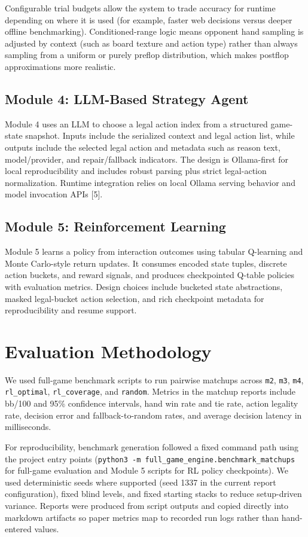 \documentclass[11pt]{article}
\begin{document}
Configurable trial budgets allow the system to trade accuracy for runtime depending on where it is used (for example, faster web decisions versus deeper offline benchmarking). Conditioned-range logic means opponent hand sampling is adjusted by context (such as board texture and action type) rather than always sampling from a uniform or purely preflop distribution, which makes postflop approximations more realistic.

\subsection{Module 4: LLM-Based Strategy Agent}
Module 4 uses an LLM to choose a legal action index from a structured game-state snapshot. Inputs include the serialized context and legal action list, while outputs include the selected legal action and metadata such as reason text, model/provider, and repair/fallback indicators. The design is Ollama-first for local reproducibility and includes robust parsing plus strict legal-action normalization. Runtime integration relies on local Ollama serving behavior and model invocation APIs [5].

\subsection{Module 5: Reinforcement Learning}
Module 5 learns a policy from interaction outcomes using tabular Q-learning and Monte Carlo-style return updates. It consumes encoded state tuples, discrete action buckets, and reward signals, and produces checkpointed Q-table policies with evaluation metrics. Design choices include bucketed state abstractions, masked legal-bucket action selection, and rich checkpoint metadata for reproducibility and resume support.

\section{Evaluation Methodology}
We used full-game benchmark scripts to run pairwise matchups across \texttt{m2}, \texttt{m3}, \texttt{m4}, \texttt{rl\_optimal}, \texttt{rl\_coverage}, and \texttt{random}. Metrics in the matchup reports include bb/100 and 95\% confidence intervals, hand win rate and tie rate, action legality rate, decision error and fallback-to-random rates, and average decision latency in milliseconds.

For reproducibility, benchmark generation followed a fixed command path using the project entry points (\texttt{python3 -m full\_game\_engine.benchmark\_matchups} for full-game evaluation and Module 5 scripts for RL policy checkpoints). We used deterministic seeds where supported (seed 1337 in the current report configuration), fixed blind levels, and fixed starting stacks to reduce setup-driven variance. Reports were produced from script outputs and copied directly into markdown artifacts so paper metrics map to recorded run logs rather than hand-entered values.
\end{document}
